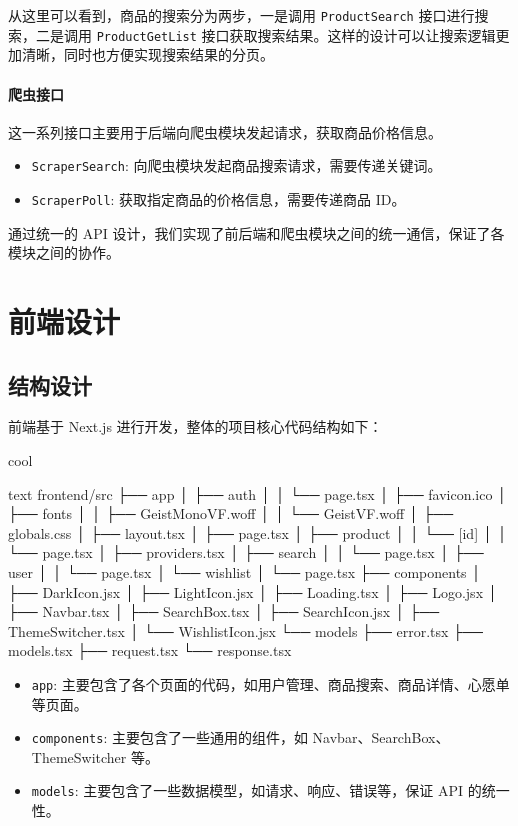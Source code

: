 从这里可以看到，商品的搜索分为两步，一是调用 \texttt{ProductSearch} 接口进行搜索，二是调用 \texttt{ProductGetList} 接口获取搜索结果。这样的设计可以让搜索逻辑更加清晰，同时也方便实现搜索结果的分页。

\subsubsection{爬虫接口}

这一系列接口主要用于后端向爬虫模块发起请求，获取商品价格信息。

\begin{itemize}
  \item \texttt{ScraperSearch}: 向爬虫模块发起商品搜索请求，需要传递关键词。
  \item \texttt{ScraperPoll}: 获取指定商品的价格信息，需要传递商品 ID。
\end{itemize}

通过统一的 API 设计，我们实现了前后端和爬虫模块之间的统一通信，保证了各模块之间的协作。

\chapter{前端设计}

\section{结构设计}

前端基于 Next.js 进行开发，整体的项目核心代码结构如下：

\begin{codebox}{}{cool}
\begin{amzcode}{text}
frontend/src
├── app
│   ├── auth
│   │   └── page.tsx
│   ├── favicon.ico
│   ├── fonts
│   │   ├── GeistMonoVF.woff
│   │   └── GeistVF.woff
│   ├── globals.css
│   ├── layout.tsx
│   ├── page.tsx
│   ├── product
│   │   └── [id]
│   │       └── page.tsx
│   ├── providers.tsx
│   ├── search
│   │   └── page.tsx
│   ├── user
│   │   └── page.tsx
│   └── wishlist
│       └── page.tsx
├── components
│   ├── DarkIcon.jsx
│   ├── LightIcon.jsx
│   ├── Loading.tsx
│   ├── Logo.jsx
│   ├── Navbar.tsx
│   ├── SearchBox.tsx
│   ├── SearchIcon.jsx
│   ├── ThemeSwitcher.tsx
│   └── WishlistIcon.jsx
└── models
    ├── error.tsx
    ├── models.tsx
    ├── request.tsx
    └── response.tsx
\end{amzcode}
\end{codebox}

\begin{itemize}
  \item \texttt{app}: 主要包含了各个页面的代码，如用户管理、商品搜索、商品详情、心愿单等页面。
  \item \texttt{components}: 主要包含了一些通用的组件，如 Navbar、SearchBox、ThemeSwitcher 等。
  \item \texttt{models}: 主要包含了一些数据模型，如请求、响应、错误等，保证 API 的统一性。
\end{itemize}

